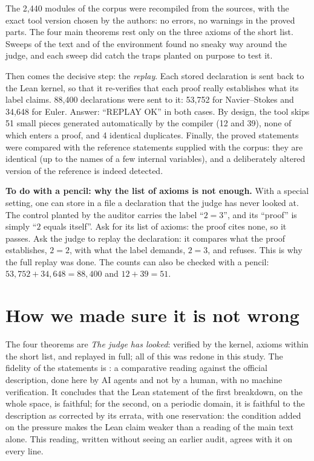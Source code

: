 The 2,440 modules of the corpus were recompiled from the sources, with the exact tool version
chosen by the authors: no errors, no warnings in the proved parts. The four main theorems rest
only on the three axioms of the short list. Sweeps of the text and of the environment found no
sneaky way around the judge, and each sweep did catch the traps planted on purpose to test it.

Then comes the decisive step: the \emph{replay}. Each stored declaration is sent back to the Lean
kernel, so that it re-verifies that each proof really establishes what its label claims. 88,400
declarations were sent to it: 53,752 for Navier--Stokes and 34,648 for Euler. Answer: ``REPLAY
OK'' in both cases. By design, the tool skips 51 small pieces generated automatically by the
compiler (12 and 39), none of which enters a proof, and 4 identical duplicates. Finally, the
proved statements were compared with the reference statements supplied with the corpus: they are
identical (up to the names of a few internal variables), and a deliberately altered version of the
reference is indeed detected.

\begin{encadre}
\textbf{To do with a pencil: why the list of axioms is not enough.} With a special setting, one
can store in a file a declaration that the judge has never looked at. The control planted by the
auditor carries the label ``$2=3$'', and its ``proof'' is simply ``$2$ equals itself''. Ask for
its list of axioms: the proof cites none, so it passes. Ask the judge to replay the declaration:
it compares what the proof establishes, $2=2$, with what the label demands, $2=3$, and refuses.
This is why the full replay was done. The counts can also be checked with a pencil:
$53{,}752+34{,}648=88{,}400$ and $12+39=51$.
\end{encadre}

\section*{How we made sure it is not wrong}

The four theorems are  \emph{The judge has looked}: verified by the kernel, axioms
within the short list, and replayed in full; all of this was redone in this study. The fidelity
of the statements is : a comparative reading against the official description, done
here by AI agents and not by a human, with no machine verification. It concludes that the Lean
statement of the first breakdown, on the whole space, is faithful; for the second, on a periodic
domain, it is faithful to the description as corrected by its errata, with one reservation: the
condition added on the pressure makes the Lean claim weaker than a reading of the main text
alone. This reading, written without seeing an earlier audit, agrees with it on every line.


